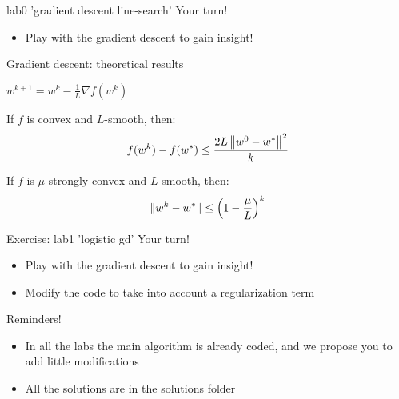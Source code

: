 \begin{frame}{lab0 'gradient descent line-search'}
    Your turn!

    \begin{itemize}
        \item  Play with the gradient descent to gain insight!
    \end{itemize}

\end{frame}


\begin{frame}{Gradient descent: theoretical results}
    \begin{algorithm}[H]
        \caption{GD}
                {
                $w^{k+1} = w^k - \frac{1}{L} \nabla f (w^k)$
                }
    \end{algorithm}
    \pause
    \begin{proposition}
        If $f$ is convex and $L$-smooth, then:
        \[
        f(w^{k}) - f(w^*)
        \leq
        \frac{2 L \left\lVert {w^0 - w^*} \right\rVert^2}{k}
        \]
    \end{proposition}
    \pause
    \begin{proposition}
        If $f$ is $\mu$-strongly convex and $L$-smooth, then:
        \[
        \lVert {w^{k} - w^*} \rVert
        \leq
        \left (
            1 - \frac{\mu}{L}
        \right)^k
        \]
    \end{proposition}
\end{frame}

\begin{frame}{Exercise: lab1 'logistic gd'}
    Your turn!

    \begin{itemize}
        \item  Play with the gradient descent to gain insight!
        \item Modify the code to take into account a regularization term
    \end{itemize}

    \vspace{2em}

    Reminders!
    \begin{itemize}
        \item In all the labs the main algorithm is already coded, and we propose you to add little modifications
        \item All the solutions are in the solutions folder
    \end{itemize}
\end{frame}
